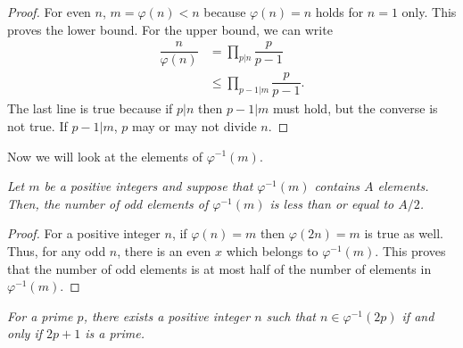 \documentclass[main.tex]{subfile}
\begin{document}
		\begin{proof}
			For even $n$, $m=\varphi(n)<n$ because $\varphi(n)=n$ holds for $n=1$ only. This proves the lower bound. For the upper bound, we can write
				\begin{align*}
					\dfrac{n}{\varphi(n)} & = \prod_{p|n}\dfrac{p}{p-1}\\
									  & \leq \prod_{p-1|m}\dfrac{p}{p-1}.
				\end{align*}
			The last line is true because if $p|n$ then $p-1|m$ must hold, but the converse is not true. If $p-1|m$, $p$ may or may not divide $n$.
		\end{proof}

	Now we will look at the elements of $\varphi^{-1}(m)$.
		\begin{theorem}\slshape
			Let $m$ be a positive integers and suppose that $\varphi^{-1}(m)$ contains $A$ elements. Then, the number of odd elements of $\varphi^{-1}(m)$ is less than or equal to $A/2$.
		\end{theorem}

		\begin{proof}
			For a positive integer $n$, if $\varphi(n)=m$ then $\varphi(2n)=m$ is true as well. Thus, for any odd $n$, there is an even $x$ which belongs to $\varphi^{-1}(m)$. This proves that the number of odd elements is at most half of the number of elements in $\varphi^{-1}(m)$.
		\end{proof}

		\begin{theorem}\slshape
			For a prime $p$, there exists a positive integer $n$ such that $n\in\varphi^{-1}(2p)$ if and only if $2p+1$ is a prime.
		\end{theorem}
\end{document}
